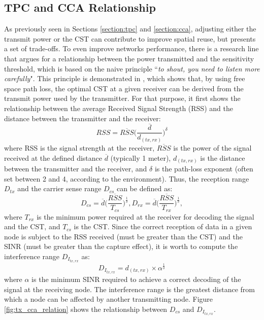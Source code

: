\documentclass[12pt, a4paper,twoside]{tesi_upf}
\begin{document}
		\subsection{TPC and CCA Relationship}
		\label{section:tpc_cst_relationship}
			As previously seen in Sections \ref{section:tpc} and \ref{section:cca}, adjusting either the transmit power or the CST can contribute to improve spatial reuse, but presents a set of trade-offs. To even improve networks performance, there is a research line that argues for a relationship between the power transmitted and the sensitivity threshold, which is based on the naive principle ``\textit{to shout, you need to listen more carefully}". This principle is demonstrated in \cite{thorpe2014survey}, which shows that, by using free space path loss, the optimal CST at a given receiver can be derived from the transmit power used by the transmitter. For that purpose, it first shows the relationship between the average Received Signal Strength (RSS) and the distance between the transmitter and the receiver:	
			\begin{equation}
				RSS = \overline{RSS} \Big( \frac{\overline{d}}{d_{(tx,rx)}} \Big)^{\delta}
				\nonumber
			\end{equation}
			where RSS is the signal strength at the receiver, $\overline{RSS}$ is the power of the signal received at the defined distance $\overline{d}$ (typically 1 meter), $d_{(tx,rx)}$ is the distance between the transmitter and the receiver, and $\delta$ is the path-loss exponent (often set between 2 and 4, according to the environment). Thus, the reception range $D_{tx}$ and the carrier sense range $D_{cs}$ can be defined as:
			\begin{equation}
				D_{cs} = \overline{d} \Big( \frac{\overline{RSS}}{T_{cs}} \Big)^\frac{1}{\delta}, 				D_{rx} = \overline{d} \Big( \frac{\overline{RSS}}{T_{rx}} \Big)^\frac{1}{\delta},
				\nonumber
			\end{equation}
			where $T_{rx}$ is the minimum power required at the receiver for  decoding the signal and the CST, and $T_{cs}$ is the CST. Since the correct reception of data in a given node is subject to the RSS received (must be greater than the CST) and the SINR (must be greater than the capture effect), it is worth to compute the interference range $D_{I_{tx,rx}}$ as:					
			\begin{equation}
				D_{I_{tx,rx}} = d_{(tx,rx)} \times \alpha ^{\frac{1}{\delta}}
				\nonumber
			\end{equation}			
			where $\alpha$ is the minimum SINR required to achieve a correct decoding of the signal at the receiving node. The interference range is the greatest distance from which a node can be affected by another transmitting node. Figure \ref{fig:tx_cca_relation} shows the relationship between $D_{cs}$ and $D_{I_{tx,rx}}$. 
\end{document}
